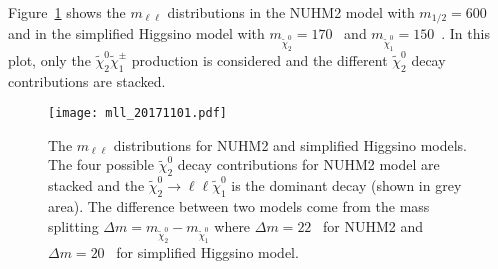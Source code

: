 
Figure~\ref{fig:data_mll_distribution} shows the $m_{\ell \ell}$ distributions in the NUHM2 model with $m_{1/2} = 600$~{\GeV} and in the simplified Higgsino model with $m_{\widetilde{\chi}^{0}_{2}} = 170$~{\GeV} and $m_{\widetilde{\chi}^{0}_{1}} = 150$~{\GeV}.
In this plot, only the $\widetilde{\chi}^{0}_{2} \widetilde{\chi}^{\pm}_{1}$ production is considered and the different $\widetilde{\chi}^{0}_{2}$ decay contributions are stacked.

\begin{figure}[htbp]
    \begin{center}
        \texttt{[image: mll\_20171101.pdf]}
        \caption{The $m_{\ell \ell}$ distributions for NUHM2 and simplified Higgsino models.
        The four possible $\widetilde{\chi}^{0}_{2}$ decay contributions for NUHM2 model are stacked and the $\widetilde{\chi}^{0}_{2} \to \ell \ell \widetilde{\chi}^{0}_{1}$ is the dominant decay (shown in grey area).
        The difference between two models come from the mass splitting $\Delta m = m_{\widetilde{\chi}^{0}_{2}} - m_{\widetilde{\chi}^{0}_{1}}$ where $\Delta m = 22$~{\GeV} for NUHM2 and $\Delta m = 20$~{\GeV} for simplified Higgsino model.}
        \label{fig:data_mll_distribution}
    \end{center}
\end{figure}


